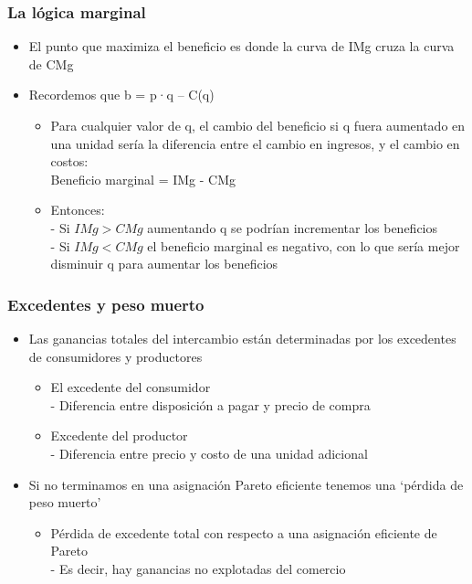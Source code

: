 \documentclass{beamer}
\begin{document}
\begin{frame}
\frametitle{ La lógica marginal}
\begin{itemize}
    \item El punto que maximiza el beneficio es donde la curva de IMg cruza la curva de CMg
    \item Recordemos que 
    b = p·q – C(q)
        \begin{itemize}
        \item Para cualquier valor de q, el cambio del beneficio si q fuera aumentado en una unidad sería la diferencia entre el cambio en ingresos, y el cambio en costos: \vspace{2mm} \\ \hspace{10mm}
    Beneficio marginal = IMg - CMg
        \vspace{2mm} \\
        \item Entonces: \\
            - Si $IMg > CMg$ aumentando q se podrían incrementar los beneficios \\
            - Si $IMg < CMg$ el beneficio marginal es negativo, con lo que sería mejor disminuir q para aumentar los beneficios
    \end{itemize}
    \end{itemize}
\end{frame}


\begin{frame}
\frametitle{ Excedentes y peso muerto}
\begin{itemize}
    \item Las ganancias totales del intercambio están determinadas por los excedentes de consumidores y productores
    \begin{itemize}
        \item El excedente del consumidor \\ - Diferencia entre disposición a pagar y precio de compra
        \item Excedente del productor \\ - Diferencia entre precio y costo de una unidad adicional
    \end{itemize}
    \item Si no terminamos en una asignación Pareto eficiente tenemos una ‘pérdida de peso muerto’
    \begin{itemize}
        \item Pérdida de excedente total con respecto a una asignación eficiente de Pareto \\
        - Es decir, hay ganancias no explotadas del comercio
    \end{itemize}
    \end{itemize}
\end{frame}
\end{document}
